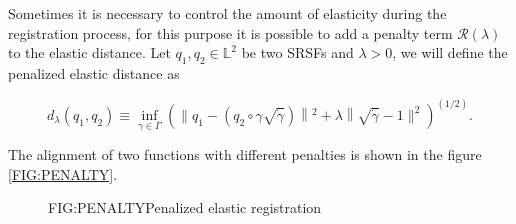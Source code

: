
Sometimes it is necessary to control the amount of elasticity during the
registration process, for this purpose it is possible to add a penalty term
$\mathcal{R}(\lambda)$ to the elastic distance.
Let $q_1, q_2 \in \mathbb{L}^2$ be two SRSFs and $\lambda > 0$, we will define
the penalized elastic distance as

$$
d_{\lambda}\left(q_{1}, q_{2}\right) \equiv \inf _{\gamma \in \Gamma}\left(
\| q_{1}-\left(q_{2} \circ \gamma \sqrt{\dot{\gamma}}\right)\left\|^{2}+
\lambda\right\| \sqrt{\dot{\gamma}}-1 \|^{2} \right)^{(1 / 2)}.
$$

The alignment of two functions with different penalties is shown in the figure \ref{FIG:PENALTY}.

\begin{figure}[Penalized elastic registration]{FIG:PENALTY}{Penalized elastic registration}
\end{figure}

